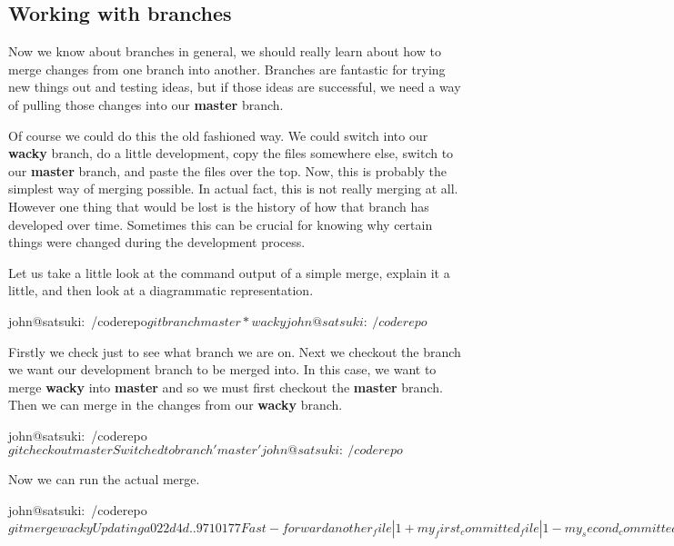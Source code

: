 \subsection{Working with branches}
Now we know about branches in general, we should really learn about how to merge changes from one branch into another.
Branches are fantastic for trying new things out and testing ideas, but if those ideas are successful, we need a way of pulling those changes into our \textbf{master} branch.

Of course we could do this the old fashioned way.
We could switch into our \textbf{wacky} branch, do a little development, copy the files somewhere else, switch to our \textbf{master} branch, and paste the files over the top.
Now, this is probably the simplest way of merging possible.
In actual fact, this is not really merging at all.
However one thing that would be lost is the history of how that branch has developed over time.
Sometimes this can be crucial for knowing why certain things were changed during the development process.

Let us take a little look at the command output of a simple merge, explain it a little, and then look at a diagrammatic representation.

\begin{code}
john@satsuki:~/coderepo$ git branch
  master
* wacky
john@satsuki:~/coderepo$
\end{code}

Firstly we check just to see what branch we are on.
Next we checkout the branch we want our development branch to be merged into.
In this case, we want to merge \textbf{wacky} into \textbf{master} and so we must first checkout the \textbf{master} branch.
Then we can merge in the changes from our \textbf{wacky} branch.

\begin{code}
john@satsuki:~/coderepo$ git checkout master
Switched to branch 'master'
john@satsuki:~/coderepo$
\end{code}

Now we can run the actual merge.

\begin{code}
john@satsuki:~/coderepo$ git merge wacky
Updating a022d4d..9710177
Fast-forward
 another_file             |    1 +
 my_first_committed_file  |    1 -
 my_second_committed_file |    1 -
 newfile1                 |    1 +
 newfile2                 |    1 +
 5 files changed, 3 insertions(+), 2 deletions(-)
 create mode 100644 another_file
 delete mode 100644 my_first_committed_file
 delete mode 100644 my_second_committed_file
 create mode 100644 newfile1
 create mode 100644 newfile2
john@satsuki:~/coderepo$
\end{code}

